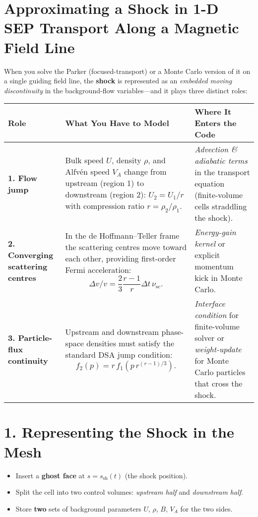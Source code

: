 

\section*{Approximating a Shock in 1-D SEP Transport Along a Magnetic Field Line}

When you solve the Parker (focused-transport) or a Monte Carlo version of it on a single guiding field line, the \textbf{shock} is represented as an \textit{embedded moving discontinuity} in the background-flow variables—and it plays three distinct roles:

\begin{center}
\begin{tabular}{@{}p{3cm}p{8cm}p{4.5cm}@{}}
\toprule
\textbf{Role} & \textbf{What You Have to Model} & \textbf{Where It Enters the Code} \\
\midrule
\textbf{1. Flow jump} & Bulk speed $U$, density $\rho$, and Alfvén speed $V_A$ change from upstream (region 1) to downstream (region 2): $U_2 = U_1 / r$ with compression ratio $r = \rho_2 / \rho_1$. & \textit{Advection \& adiabatic terms} in the transport equation (finite-volume cells straddling the shock). \\
\midrule
\textbf{2. Converging scattering centres} & In the de Hoffmann–Teller frame the scattering centres move toward each other, providing first-order Fermi acceleration:
\[
\Delta v / v = \frac{2}{3} \frac{r-1}{r} \Delta t\, \nu_{\text{sc}}.
\] & \textit{Energy-gain kernel} or explicit momentum kick in Monte Carlo. \\
\midrule
\textbf{3. Particle-flux continuity} & Upstream and downstream phase-space densities must satisfy the standard DSA jump condition:
\[
f_2(p) = r\, f_1\left(p\, r^{(r-1)/3}\right).
\] & \textit{Interface condition} for finite-volume solver or \textit{weight-update} for Monte Carlo particles that cross the shock. \\
\bottomrule
\end{tabular}
\end{center}

\hrulefill

\section*{1. Representing the Shock in the Mesh}

\begin{itemize}
    \item Insert a \textbf{ghost face} at $s = s_{\text{sh}}(t)$ (the shock position).
    \item Split the cell into two control volumes: \textit{upstream half} and \textit{downstream half}.
    \item Store \textbf{two} sets of background parameters $U$, $\rho$, $B$, $V_A$ for the two sides.
\end{itemize}

